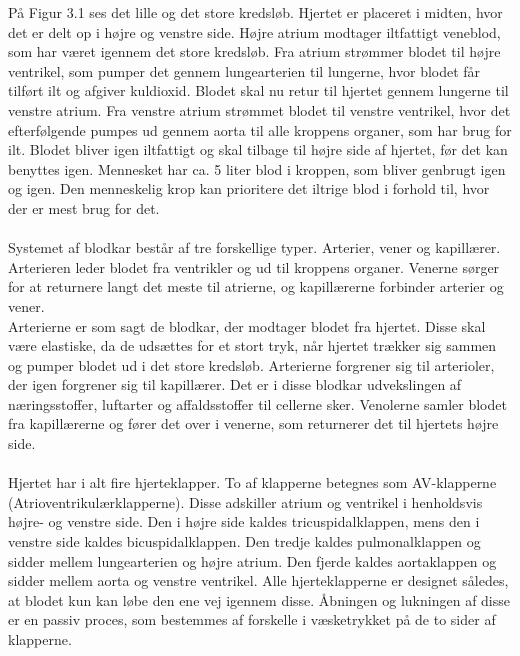 På Figur 3.1 ses det lille og det store kredsløb. Hjertet er placeret i midten, hvor det er delt op i højre og venstre side. Højre atrium modtager iltfattigt veneblod, som har været igennem det store kredsløb. Fra atrium strømmer blodet til højre ventrikel, som pumper det gennem lungearterien til lungerne, hvor blodet får tilført ilt og afgiver kuldioxid. Blodet skal nu retur til hjertet gennem lungerne til venstre atrium. Fra venstre atrium strømmet blodet til venstre ventrikel, hvor det efterfølgende pumpes ud gennem aorta til alle kroppens organer, som har brug for ilt. Blodet bliver igen iltfattigt og skal tilbage til højre side af hjertet, før det kan benyttes igen. Mennesket har ca. 5 liter blod i kroppen, som bliver genbrugt igen og igen. Den menneskelig krop kan prioritere det iltrige blod i forhold til, hvor der er mest brug for det. 
\\ \\
Systemet af blodkar består af tre forskellige typer. Arterier, vener og kapillærer. Arterieren leder blodet fra ventrikler og ud til kroppens organer. Venerne sørger for at returnere langt det meste til atrierne, og kapillærerne forbinder arterier og vener. 
 \\
Arterierne er som sagt de blodkar, der modtager blodet fra hjertet. Disse skal være elastiske, da de udsættes for et stort tryk, når hjertet trækker sig sammen og pumper blodet ud i det store kredsløb. Arterierne forgrener sig til arterioler, der igen forgrener sig til kapillærer. Det er i disse blodkar udvekslingen af næringsstoffer, luftarter og affaldsstoffer til cellerne sker. Venolerne samler blodet fra kapillærerne og fører det over i venerne, som returnerer det til hjertets højre side.
\\ \\
Hjertet har i alt fire hjerteklapper. To af klapperne betegnes som AV-klapperne (Atrioventrikulærklapperne). Disse adskiller atrium og ventrikel i henholdsvis højre- og venstre side. Den i højre side kaldes tricuspidalklappen, mens den i venstre side kaldes bicuspidalklappen. Den tredje kaldes pulmonalklappen og sidder mellem lungearterien og højre atrium. Den fjerde kaldes aortaklappen og sidder mellem aorta og venstre ventrikel. Alle hjerteklapperne er designet således, at blodet kun kan løbe den ene vej igennem disse. Åbningen og lukningen af disse er en passiv proces, som bestemmes af forskelle i væsketrykket på de to sider af klapperne. 

